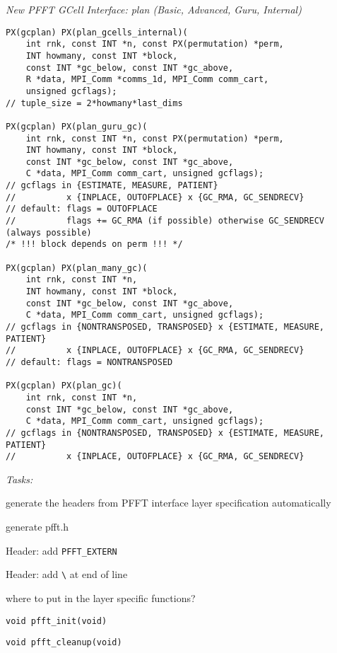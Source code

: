 \emph{New PFFT GCell Interface: plan (Basic, Advanced, Guru, Internal)}
\begin{lstlisting}
PX(gcplan) PX(plan_gcells_internal)(
    int rnk, const INT *n, const PX(permutation) *perm,
    INT howmany, const INT *block,
    const INT *gc_below, const INT *gc_above,
    R *data, MPI_Comm *comms_1d, MPI_Comm comm_cart,
    unsigned gcflags);
// tuple_size = 2*howmany*last_dims

PX(gcplan) PX(plan_guru_gc)(
    int rnk, const INT *n, const PX(permutation) *perm,
    INT howmany, const INT *block,
    const INT *gc_below, const INT *gc_above,
    C *data, MPI_Comm comm_cart, unsigned gcflags);
// gcflags in {ESTIMATE, MEASURE, PATIENT}
//          x {INPLACE, OUTOFPLACE} x {GC_RMA, GC_SENDRECV}
// default: flags = OUTOFPLACE
//          flags += GC_RMA (if possible) otherwise GC_SENDRECV (always possible)
/* !!! block depends on perm !!! */

PX(gcplan) PX(plan_many_gc)(
    int rnk, const INT *n,
    INT howmany, const INT *block,
    const INT *gc_below, const INT *gc_above,
    C *data, MPI_Comm comm_cart, unsigned gcflags);
// gcflags in {NONTRANSPOSED, TRANSPOSED} x {ESTIMATE, MEASURE, PATIENT}
//          x {INPLACE, OUTOFPLACE} x {GC_RMA, GC_SENDRECV}
// default: flags = NONTRANSPOSED

PX(gcplan) PX(plan_gc)(
    int rnk, const INT *n,
    const INT *gc_below, const INT *gc_above,
    C *data, MPI_Comm comm_cart, unsigned gcflags);
// gcflags in {NONTRANSPOSED, TRANSPOSED} x {ESTIMATE, MEASURE, PATIENT}
//          x {INPLACE, OUTOFPLACE} x {GC_RMA, GC_SENDRECV}
\end{lstlisting}



\emph{Tasks:}
\begin{compactitem}
  \item generate the headers from PFFT interface layer specification automatically
  \item generate pfft.h
  \begin{compactitem}
    \item Header: add \verb+PFFT_EXTERN+
    \item Header: add \verb+\+ at end of line
  \end{compactitem}
  \item where to put in the layer specific functions?
  \begin{compactitem}
    \item \verb+void pfft_init(void)+
    \item \verb+void pfft_cleanup(void)+
  \end{compactitem}
\end{compactitem}




